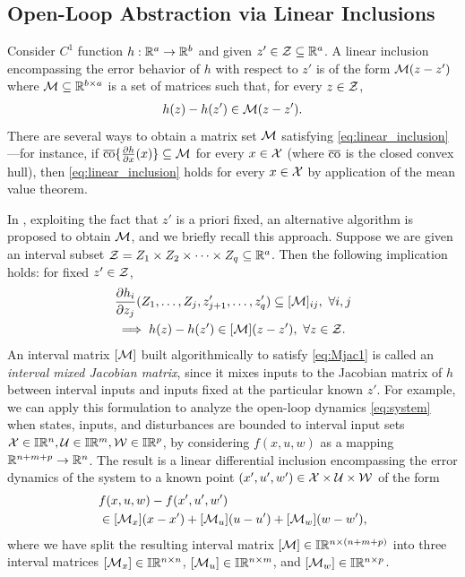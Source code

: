 \documentclass{IEEEojcsys}
\begin{document}
\subsection{Open-Loop Abstraction via Linear Inclusions}
\label{section:mjacm}
Consider $C^1$ function $h:\mathbb{R}^a\to\mathbb{R}^b$ and given $z'\in\mathcal{Z}\subseteq\mathbb{R}^a$. 
A linear inclusion encompassing the error behavior of $h$ with respect to $z'$ is of the form $\mathcal{M}(z - z')$ where $\mathcal{M}\subseteq\mathbb{R}^{b\times a}$ is a set of matrices such that, for every $z\in\mathcal{Z}$,
\begin{align} \label{eq:linear_inclusion}
    h(z) - h(z') \in \calM(z - z').
\end{align}
There are several ways to obtain a matrix set $\mathcal{M}$ satisfying \eqref{eq:linear_inclusion}---for instance, if $\overline{\operatorname{co}}\{\frac{\partial h}{\partial x}(x)\} \subseteq\mathcal{M}$ for every $x\in\mathcal{X}$ (where $\overline{\operatorname{co}}$ is the closed convex hull), then \eqref{eq:linear_inclusion} holds for every $x\in\mathcal{X}$ by application of the mean value theorem.

In \cite{harapanahalliLDI}, exploiting the fact that $z'$ is a priori fixed, an alternative algorithm is proposed to obtain $\mathcal{M}$, and we briefly recall this approach. %
Suppose we are given an interval subset $\mathcal{Z} = Z_1 \times Z_2 \times \cdots \times Z_q\subseteq \mathbb{R}^a$. 
Then the following implication holds: for fixed $z'\in\mathcal{Z}$,
\begin{align}
\label{eq:Mjac1}
    &\frac{\partial h_i}{\partial z_j} (Z_1,\dots,Z_j,z'_{j+1},\dots,z'_q) \subseteq [\calM]_{ij}, \ \forall i, j \\
    &\implies h(z) - h(z') \in [\calM] (z - z'), \ \forall z\in\calZ.
\end{align}
An interval matrix $[\mathcal{M}]$ built algorithmically to satisfy \eqref{eq:Mjac1} is called an \emph{interval mixed Jacobian matrix}, since it mixes inputs to the Jacobian matrix of $h$ between interval inputs and inputs fixed at the particular known $z'$.
For example, we can apply this formulation to analyze the open-loop dynamics \eqref{eq:system} when states, inputs, and disturbances are bounded to interval input sets $\mathcal{X} \in \mathbb{I}\mathbb{R}^n,\mathcal{U} \in \mathbb{I}\mathbb{R}^m,\mathcal{W} \in \mathbb{I}\mathbb{R}^p$, by considering $f(x,u,w)$ as a mapping $\mathbb{R}^{n+m+p}\to\mathbb{R}^n$. The result is a linear differential inclusion encompassing the error dynamics of the system to a known point $(x',u',w')\in\mathcal{X}\times\mathcal{U}\times\mathcal{W}$ of the form
\begin{align} \label{eq:algebraic_inc}
\begin{aligned} 
    &f(x,u,w) - f(x',u',w') \\ 
    &\in [\calM_x](x - x') + [\calM_u](u - u') + [\calM_w](w - w'),
\end{aligned}
\end{align}
where we have split the resulting interval matrix $[\mathcal{M}]\in\mathbb{I}\mathbb{R}^{n\times(n + m + p)}$ into three interval matrices $[\mathcal{M}_x]\in\mathbb{I}\mathbb{R}^{n\times n}$, $[\mathcal{M}_u]\in\mathbb{I}\mathbb{R}^{n\times m}$, and $[\mathcal{M}_w]\in\mathbb{I}\mathbb{R}^{n\times p}$.
\end{document}
